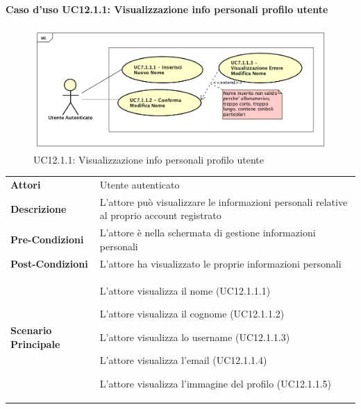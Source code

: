 \paragraph{Caso d'uso UC12.1.1: Visualizzazione info personali profilo utente}
\label{UC12_1_1}
\begin{figure}[ht]
	\centering
	\includegraphics[scale=0.45]{UML/UC7_1_1.png}
	\caption{UC12.1.1: Visualizzazione info personali profilo utente}
\end{figure}
\FloatBarrier
\begin{tabular}{ l | p{11cm}}
	\hline
	\rowcolor{Gray}
	\multicolumn{2}{c}{UC12.1.1 - Visualizzazione info personali profilo utente} \\
	\hline
	\textbf{Attori} & Utente autenticato \\
	\textbf{Descrizione} & L'attore può visualizzare le informazioni personali relative al proprio account registrato\\
	\textbf{Pre-Condizioni} & L'attore è nella schermata di gestione informazioni personali\\
	\textbf{Post-Condizioni} & L'attore ha visualizzato le proprie informazioni personali \\
	\textbf{Scenario Principale} & 
	\begin{enumerate*}[label=(\arabic*.),itemjoin={\newline}]
		\item L'attore visualizza il nome (UC12.1.1.1)
		\item L'attore visualizza il cognome (UC12.1.1.2)
		\item L'attore visualizza lo username (UC12.1.1.3)
		\item L'attore visualizza l'email (UC12.1.1.4)
		\item L'attore visualizza l'immagine del profilo (UC12.1.1.5)
	\end{enumerate*}
\end{tabular}

